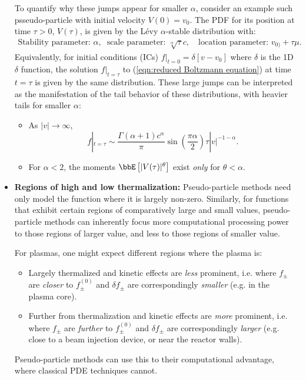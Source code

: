 \begin{itemize}
        To quantify why these jumps appear for smaller $\alpha$, consider an example such psseudo-particle with initial velocity $V(0)  =  v_{0}$. The PDF for its position at time $\tau  >  0$, $V(\tau)$, is given by the Lévy $\alpha$-stable distribution \cite{Lévy_1925, Mandelbrot_1960} with:
        \begin{align*}
            \text{Stability parameter: } \alpha,            &&
            \text{scale parameter: } \sqrt[\alpha]{\tau}c,  &&
            \text{location parameter: } v_{0)} + \tau\mu.
        \end{align*}
        Equivalently, for initial conditions (ICs) $f|_{t = 0}  =  \delta[v - v_{0}]$ where $\delta$ is the 1D $\delta$ function, the solution $f|_{t = \tau}$ to (\ref{eqn:reduced Boltzmann equation}) at time $t = \tau$ is given by the same distribution. These large jumps can be interpreted as the manifestation of the tail behavior of these distributions, with heavier tails for smaller $\alpha$:
        \begin{itemize}
            \item  As $|v|  \rightarrow  \infty$, \cite{Nolan_2020}
            \begin{equation}
                f|_{t = \tau}  \sim  \frac{\Gamma(\alpha + 1)c^{\alpha}}{\pi}\sin\left(\frac{\pi\alpha}{2}\right)\tau|v|^{- 1 - \alpha}.
            \end{equation}
            \item  For $\alpha  <  2$, the moments $\bbE\left[|V(\tau)|^{\theta}\right]$ exist \emph{only} for $\theta  <  \alpha$.
        \end{itemize}
        
        \item  {\bf Regions of high and low thermalization:} Pseudo-particle methods need only model the function where it is largely non-zero. Similarly, for functions that exhibit certain regions of comparatively large and small values, pseudo-particle methods can inherently focus more computational processing power to those regions of larger value, and less to those regions of smaller value.
        
        For plasmas, one might expect different regions where the plasma is:
        \begin{itemize}
            \item  Largely thermalized and kinetic effects are \emph{less} prominent, i.e. where $f_{\pm}$ are \emph{closer} to $f_{\pm}^{(0)}$ and $\delta\!f_{\pm}$ are correspondingly \emph{smaller} (e.g. in the plasma core).
            \item  Further from thermalization and kinetic effects are \emph{more} prominent, i.e. where $f_{\pm}$ are \emph{further} to $f_{\pm}^{(0)}$ and $\delta\!f_{\pm}$ are correspondingly \emph{larger} (e.g. close to a beam injection device, or near the reactor walls).
        \end{itemize}
        Pseudo-particle methods can use this to their computational advantage, where classical PDE techniques cannot.
    \end{itemize}
    